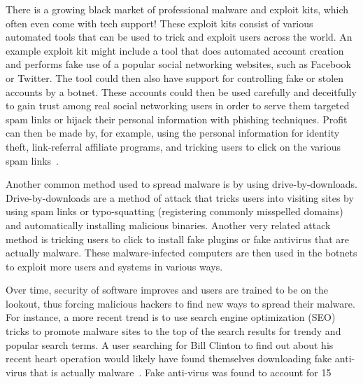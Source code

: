 There is a growing black market of professional malware and exploit kits, which often even come with tech support\cite{paxson_sellingviagra_2009}! These exploit kits consist of various automated tools that can be used to trick and exploit users across the world. An example exploit kit might include a tool that does automated account creation and performs fake use of a popular social networking websites, such as Facebook or Twitter. The tool could then also have support for controlling fake or stolen accounts by a botnet. These accounts could then be used carefully and deceitfully to gain trust among real social networking users in order to serve them targeted spam links or hijack their personal information with phishing techniques. Profit can then be made by, for example, using the personal information for identity theft, link-referral affiliate programs, and tricking users to click on the various spam links~\cite{paxson_sellingviagra_2009}.

Another common method used to spread malware is by using drive-by-downloads. Drive-by-downloads are a method of attack that tricks users into visiting sites by using spam links or typo-squatting (registering commonly misspelled domains) and automatically installing malicious binaries. Another very related attack method is tricking users to click to install fake plugins or fake antivirus that are actually malware\cite{provos_2007}. These malware-infected computers are then used in the botnets to exploit more users and systems in various ways.

Over time, security of software improves and users are trained to be on the lookout, thus forcing malicious hackers to find new ways to spread their malware. For instance, a more recent trend is to use search engine optimization (SEO) tricks to promote malware sites to the top of the search results for trendy and popular search terms. A user searching for Bill Clinton to find out about his recent heart operation would likely have found themselves downloading fake anti-virus that is actually malware~\cite{eWeek_2010}. Fake anti-virus was found to account for 15%


